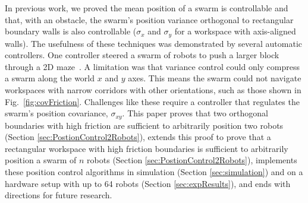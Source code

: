 In previous work, we proved the mean position of a swarm is controllable and that, with an obstacle, the swarm's position variance orthogonal to rectangular boundary walls  is also controllable
($\sigma_x$ and $\sigma_y$ for a workspace with axis-aligned walls). 
The usefulness of these techniques was demonstrated by several automatic controllers. One controller steered a swarm of robots to push a larger block through a 2D maze~\citet{ShahrokhiIROS2015}. 
A limitation was that variance control could only compress a swarm along the world $x$ and $y$ axes.  This means the swarm could not navigate workspaces with narrow corridors with other orientations, such as those shown in Fig.\ \ref{fig:covFriction}.
Challenges like these require a controller that regulates the swarm's position covariance, $\sigma_{xy}$. 
This paper proves that two orthogonal boundaries with high friction are sufficient to arbitrarily position two robots (Section \ref{sec:PostionControl2Robots}), extends this proof to prove that a rectangular workspace with high friction boundaries is sufficient to arbitrarily position a swarm of $n$ robots (Section \ref{sec:PostionControl2Robots}), implements these position control algorithms in simulation (Section \ref{sec:simulation}) and on a hardware setup with up to 64 robots (Section \ref{sec:expResults}), and ends with directions for future research.
